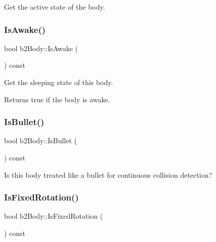 Get the active state of the body. 

\mbox{\label{classb2_body_a697f708427cdf7d31a626e80e694682c}} 
\subsubsection{\texorpdfstring{IsAwake()}{IsAwake()}}
{\footnotesize\ttfamily bool b2\+Body\+::\+Is\+Awake (\begin{DoxyParamCaption}{ }\end{DoxyParamCaption}) const\hspace{0.3cm}{\ttfamily [inline]}}

Get the sleeping state of this body. \begin{DoxyReturn}{Returns}
true if the body is awake. 
\end{DoxyReturn}
\mbox{\label{classb2_body_ad99db1c7a19e8de333ff7f65b0b953f4}} 
\subsubsection{\texorpdfstring{IsBullet()}{IsBullet()}}
{\footnotesize\ttfamily bool b2\+Body\+::\+Is\+Bullet (\begin{DoxyParamCaption}{ }\end{DoxyParamCaption}) const\hspace{0.3cm}{\ttfamily [inline]}}



Is this body treated like a bullet for continuous collision detection? 

\mbox{\label{classb2_body_a0920b7a770f7c876cf6d149e227036b5}} 
\subsubsection{\texorpdfstring{IsFixedRotation()}{IsFixedRotation()}}
{\footnotesize\ttfamily bool b2\+Body\+::\+Is\+Fixed\+Rotation (\begin{DoxyParamCaption}{ }\end{DoxyParamCaption}) const\hspace{0.3cm}{\ttfamily [inline]}}



